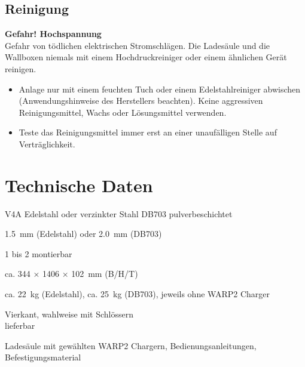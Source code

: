 \documentclass[a4paper,10pt]{article}
\newcommand{\warn}[1]{\begin{tcolorbox}[colback=boxred,colframe=red,coltext=
white,title=Warnung]#1\end{tcolorbox}}
\begin{document}
\begin{multicols*}{2}
	\subsection{Reinigung}
	\warn{\textbf{Gefahr! Hochspannung}\\Gefahr von tödlichen elektrischen
	Stromschlägen. Die Ladesäule und die Wallboxen niemals mit einem Hochdruckreiniger oder einem ähnlichen Gerät reinigen.}
	\begin{itemize}
		\item Anlage nur mit einem feuchten Tuch oder einem Edelstahlreiniger abwischen (Anwendungshinweise des Herstellers beachten). Keine aggressiven Reinigungsmittel, Wachs oder Lösungsmittel verwenden.
		\item Teste das Reinigungsmittel immer erst an einer unaufälligen Stelle auf Verträglichkeit.
	\end{itemize}

	\section{Technische Daten}

	\begin{minipage}{\linewidth}
		\begin{description}[leftmargin=!,labelwidth=\widthof{\textbf{WARP2 Charger}}]
			\setlength{\itemsep}{3pt}
			\item[Material] V4A Edelstahl oder verzinkter Stahl DB703 pulverbeschichtet
			\item[Materialstärke] \SI{1.5}{\milli\meter} (Edelstahl) oder \SI{2.0}{\milli\meter} (DB703)
			\item[WARP2 Charger] 1 bis 2 montierbar
			\item[Abmessungen] ca. 344 × 1406 × \SI{102}{\milli\meter} (B/H/T)
			\item[Gewicht] ca. \SI{22}{\kilo\gram} (Edelstahl), ca.
			\SI{25}{\kilo\gram} (DB703), jeweils ohne WARP2 Charger
			\item[Verriegelung]
			      Vierkant, wahlweise mit Schlössern\\ lieferbar
			\item[Lieferumfang] Ladesäule mit gewählten WARP2 Chargern,
			      Bedienungsanleitungen,\\ Befestigungsmaterial
		\end{description}
	\end{minipage}


\end{multicols*}
\end{document}
